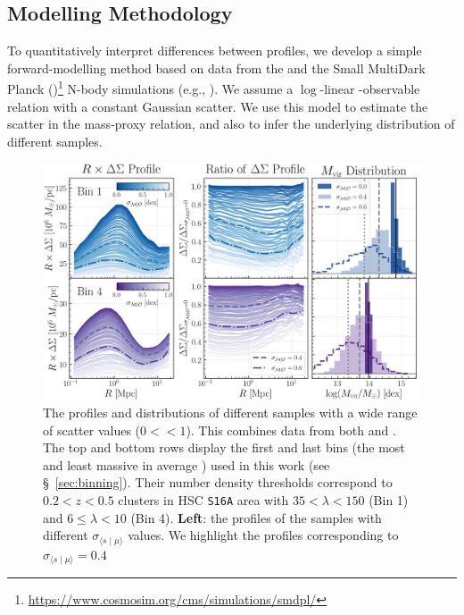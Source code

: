 \documentclass[fleqn,usenatbib,useAMS]{mnras}
\begin{document}
\begin{CJK*}{UTF8}{gbsn}
\subsection{Modelling Methodology}
    \label{sec:model}

    To quantitatively interpret differences between \dsigma{} profiles, we develop a simple
    forward-modelling method based on data from the  and the Small MultiDark Planck
    (\smdpl{})\footnote{\url{https://www.cosmosim.org/cms/simulations/smdpl/}} N-body simulations
    (e.g., \citealt{Klypin2016}).
    We assume a $\log$-linear \mvir{}-observable relation with a constant Gaussian scatter. 
    We use this model to estimate the scatter in the mass-proxy relation, and also to
    infer the underlying \mvir{} distribution of different samples.

\begin{figure}
    \centering
    \includegraphics[width=\textwidth]{figure/fig_2}
    \caption{
        The \dsigma{} profiles and \mhalo{} distributions of different \topn{} samples with
        a wide range of scatter values ($0<$\scatterMhaloObsSym{}$<1$). 
        This combines data from both  and \smdpl{}. 
        The top and bottom rows display the first and last \topn{} bins (the most and least
        massive in average \mhalo{}) used in this work (see \S\ \ref{sec:binning}).
        Their number density thresholds correspond to $0.2 < z < 0.5$ \redm{} clusters in HSC
        \texttt{S16A} area with $35 < \lambda < 150$ (Bin 1) and $6 \leq \lambda < 10$ (Bin 4).
        \textbf{Left}: the \rdsigma{} profiles of the \topn{} samples with different
        $\sigma_{\langle s \mid \mu\rangle}$ values. 
        We highlight the profiles corresponding to $\sigma_{\langle s \mid \mu\rangle}=0.4$
}
\end{figure}
\end{CJK*}
\end{document}
